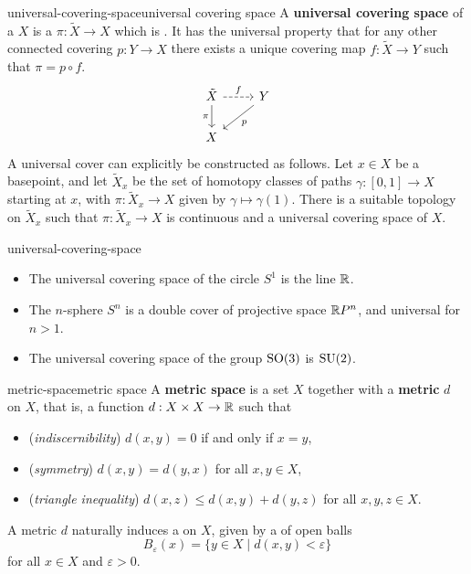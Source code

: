 \begin{topic}{universal-covering-space}{universal covering space}
    A \textbf{universal covering space} of a  $X$ is a  $\pi : \tilde{X} \to X$ which is . It has the universal property that for any other connected covering $p : Y \to X$ there exists a unique covering map $f : \tilde{X} \to Y$ such that $\pi = p \circ f$.
    \[ \begin{tikzcd} \tilde{X} \arrow[swap]{d}{\pi} \arrow[dashed]{r}{f} & Y \arrow{dl}{p} \\ X & \end{tikzcd} \]
    A universal cover can explicitly be constructed as follows. Let $x \in X$ be a basepoint, and let $\tilde{X}_x$ be the set of homotopy classes of paths $\gamma : [0, 1] \to X$ starting at $x$, with $\pi : \tilde{X}_x \to X$ given by $\gamma \mapsto \gamma(1)$. There is a suitable topology on $\tilde{X}_x$ such that $\pi : \tilde{X}_x \to X$ is continuous and a universal covering space of $X$.
\end{topic}

\begin{example}{universal-covering-space}
    \begin{itemize}
        \item The universal covering space of the circle $S^1$ is the line $\mathbb{R}$.
        \item The $n$-sphere $S^n$ is a double cover of projective space $\mathbb{R} P^n$, and universal for $n > 1$.
        \item The universal covering space of the group $\textup{SO}(3)$ is $\textup{SU}(2)$. 
    \end{itemize}    
\end{example}

\begin{topic}{metric-space}{metric space}
    A \textbf{metric space} is a set $X$ together with a \textbf{metric} $d$ on $X$, that is, a function $d : X \times X \to \mathbb{R}$ such that
    \begin{itemize}
        \item (\textit{indiscernibility}) $d(x, y) = 0$ if and only if $x = y$,
        \item (\textit{symmetry}) $d(x, y) = d(y, x)$ for all $x, y \in X$,
        \item (\textit{triangle inequality}) $d(x, z) \le d(x, y) + d(y, z)$ for all $x, y, z \in X$.
    \end{itemize}
    A metric $d$ naturally induces a  on $X$, given by a  of open balls
    \[ B_\varepsilon(x) = \{ y \in X \mid d(x, y) < \varepsilon \} \]
    for all $x \in X$ and $\varepsilon > 0$.
\end{topic}

